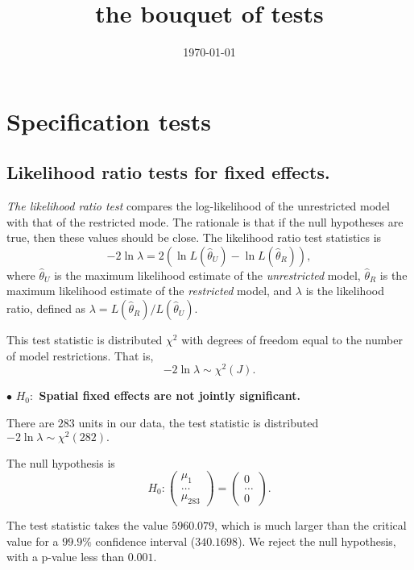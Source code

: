 \documentclass[11pt,a4paper]{amsart}
\theoremstyle{plain}
\theoremstyle{definition}
\begin{document}
\title{the bouquet of tests}
\date{\today}
\maketitle
\tableofcontents
\newpage
		
\section {Specification tests}
\subsection{Likelihood ratio tests for fixed effects. }\hfill\par
		
\textit{The likelihood ratio test} compares the log-likelihood of the unrestricted model with that of the restricted mode. The rationale is that if the null hypotheses are true, then these values should be close. The likelihood ratio test statistics is 
\[	-2 \ln \lambda = 2(\ln L(\hat{\theta}_{U}) - \ln L(\hat{\theta}_{R}) ),	\]
where $\hat{\theta}_{U}$ is the maximum likelihood estimate of the \emph{unrestricted} model, $\hat{\theta}_{R}$ is the maximum likelihood estimate of the \emph{restricted} model, and $\lambda$ is the likelihood ratio, defined as $\lambda = L(\hat{\theta}_{R}) / L(\hat{\theta}_{U})$.
		
This test statistic is distributed $\chi^{2}$ with degrees of freedom equal to the number of model restrictions. That is,
	\[	-2 \ln \lambda \sim \chi^{2}(J).	\]
		
$\bullet$ \textbf{$H_{0}:$ Spatial fixed effects are not jointly significant.} 
		
There are $283$ units in our data, the test statistic is distributed  $-2 \ln \lambda \sim \chi^{2}(282).$
		
The null hypothesis is 
\[	H_{0}: \begin{pmatrix}
		\mu_{1} \\
		\dots \\
		\mu_{283}
\end{pmatrix} = \begin{pmatrix}
		0 \\
		\dots \\
		0
\end{pmatrix}.	\]
		
The test statistic takes the value $5960.079$, which is much larger than the critical value for a $99.9\%$ confidence interval ($340.1698$). We reject the null hypothesis,  with a p-value less than $0.001$.
\end{document}
